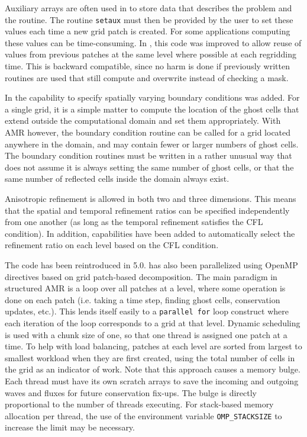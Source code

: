 Auxiliary arrays are often used in \clawpack to store data that 
describes the problem and the routine.
The routine \texttt{setaux} must then be provided by the user to set these values each time a
new grid patch is created.  For some applications computing these values can be time-consuming.  In ,
this code was improved to allow reuse of values from previous patches at
the same level where possible at each regridding time. 
This is backward compatible, since no harm is done if previously
written routines are used that still compute and overwrite instead of
checking a mask.  

In  the capability to specify spatially varying boundary conditions
was added. For a single grid, it is a simple matter to
compute the location of the ghost cells that extend
outside the computational domain and set them appropriately.
With AMR however, the boundary condition routine can be called
for a grid located anywhere in the domain, and may contain fewer
or larger numbers of ghost cells. The boundary condition routines
must be written in a rather unusual way that does not assume it
is always setting the same number of ghost cells, or that the
same number of reflected cells inside the domain always exist.

Anisotropic refinement is allowed in both two and three dimensions.  This means that the spatial and temporal refinement ratios can be specified independently from one another (as long as the temporal refinement satisfies the CFL condition).
In addition, capabilities have been added to automatically select the 
refinement ratio on each level based on the CFL condition.

The  \amrclaw code has been
reintroduced in 5.0. \amrclaw has also been parallelized using OpenMP directives based on grid patch-based decomposition.
The main paradigm in structured AMR is a loop over
all patches at a level, where some operation is done on each patch
(i.e. taking a time step, finding ghost cells, conservation
updates, etc.).  This lends itself easily to a {\tt parallel for} loop
construct where each iteration of the loop corresponds to a
grid at that level. Dynamic scheduling is used with a chunk size
of one, so that one thread is assigned one patch at a time. 
To help with load balancing, patches at
each level are sorted from largest to smallest workload when they
are first created, using
the total number of cells in the grid as an indicator of work.
Note that this approach causes a memory bulge. Each thread
must have its own scratch arrays to save the incoming and
outgoing waves and fluxes for future conservation fix-ups. 
The bulge is directly proportional to the number
of threads executing. For stack-based memory allocation per
thread, the use of the environment variable 
{\tt OMP\_STACKSIZE} to increase the limit may be necessary.

